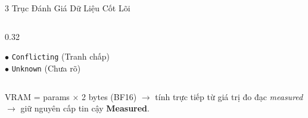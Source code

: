 \documentclass[aspectratio=169, xcolor=table]{beamer}
\begin{document}
\begin{frame}{3 Trục Đánh Giá Dữ Liệu Cốt Lõi}
\begin{columns}[onlytextwidth, T]
\begin{column}{0.32\textwidth}
\begin{infobox}
                $\bullet$ \texttt{Conflicting} (Tranh chấp)\\
                $\bullet$ \texttt{Unknown} (Chưa rõ)
            \end{infobox}
        \end{column}
    \end{columns}
    \vspace{0.05cm}
    \begin{alertbox}
        \scriptsize
        VRAM = params $\times$ 2 bytes (BF16) $\to$ tính trực tiếp từ giá trị đo đạc \textit{measured} $\to$ giữ nguyên cấp tin cậy \textbf{Measured}.
    \end{alertbox}
\end{frame}
\end{document}
